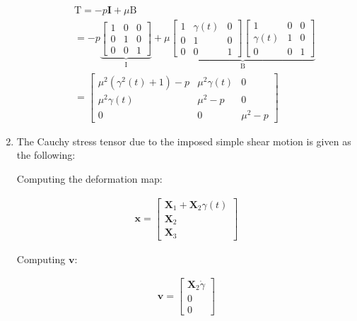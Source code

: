\begin{problem}
\begin{enumerate}
\begin{enumerate}
            \begin{align}
                \text{T} = -p\mathbf{\text{I}}+ \mu \text{B} \\
                =-p\underbrace{ \begin{bmatrix}
                1 & 0 & 0 \\
                0 & 1 & 0 \\
                0 & 0 & 1
                \end{bmatrix} }_{ \text{I} }+\mu \underbrace{ \begin{bmatrix}
                1 & \gamma(t) & 0 \\
                0 & 1 & 0 \\
                0 & 0 & 1
                \end{bmatrix}\begin{bmatrix}
                1 & 0 & 0 \\
                \gamma (t) & 1 & 0 \\
                0 & 0 & 1
                \end{bmatrix} }_{ \text{B} } \\
                =\begin{bmatrix}
                \mu^2(\gamma^2(t)+1)-p & \mu^2\gamma(t) & 0 \\
                \mu^2\gamma(t) & \mu^2-p & 0 \\
                0 & 0 & \mu^2-p
                \end{bmatrix}
                \end{align}
                
            \end{enumerate}
            \item The Cauchy stress tensor due to the imposed simple shear motion is given as the following:
            
            Computing the deformation map:


\begin{align}
\mathbf{x}=\begin{bmatrix}
\mathbf{X}_{1}+\mathbf{X}_{2}\gamma(t) \\
\mathbf{X}_{2} \\
\mathbf{X}_{3}
\end{bmatrix}
\end{align}


Computing $\mathbf{v}$:


\begin{align}
\mathbf{v}=\begin{bmatrix}
\mathbf{X}_{2}\dot{\gamma} \\
0 \\
0
\end{bmatrix}
\end{align}



\end{enumerate}
\end{problem}
